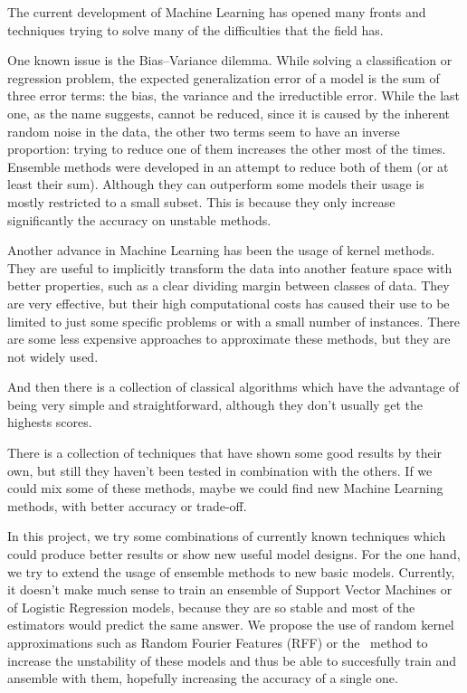\begin{pre-delivery}
  The current development of Machine Learning has opened many fronts and
  techniques trying to solve many of the difficulties that the field has.

  One known issue is the Bias--Variance dilemma. While solving a classification
  or regression problem, the expected generalization error of a model is the
  sum of three error terms: the bias, the variance and the irreductible error.
  While the last one, as the name suggests, cannot be reduced, since it is
  caused by the inherent random noise in the data, the other two terms seem
  to have an inverse proportion: trying to reduce one of them increases the
  other most of the times.
  Ensemble methods were developed in an attempt to reduce both of them (or at
  least their sum).
  Although they can outperform some models
  their usage is mostly restricted to a small subset.
  This is because they only increase significantly the accuracy on unstable
  methods.

  Another advance in Machine Learning has been the usage of kernel methods. They
  are useful to implicitly transform the data into another feature space with better properties,
  such as a clear dividing margin between classes of data. They are very
  effective, but their high computational costs has caused their use to be limited to just
  some specific problems or with a small number of instances. There are some
  less expensive approaches to approximate these methods, but they are not
  widely used.

  And then there is a collection of classical algorithms which have the
  advantage of being very simple and straightforward, although they don't
  usually get the highests scores.

  There is a collection of techniques that have shown some good results by their
  own, but still they haven't been tested in combination with the others. If we
  could mix some of these methods, maybe we could find new Machine Learning
  methods, with better accuracy or trade-off.

  In this project, we try some combinations of currently known techniques which
  could produce better results or show new useful model designs. For the one
  hand, we try to extend the usage of ensemble methods to new basic models.
  Currently, it doesn't make much sense to train an ensemble of Support Vector
  Machines or of Logistic Regression models, because they are so stable and
  most of the estimators would predict the same answer. We propose the use of
  random kernel approximations such as Random Fourier Features (RFF) or the
  \Nys\ method to increase the unstability of these models and thus be able to
  succesfully train and ansemble with them, hopefully increasing the accuracy
  of a single one.


\end{pre-delivery}

